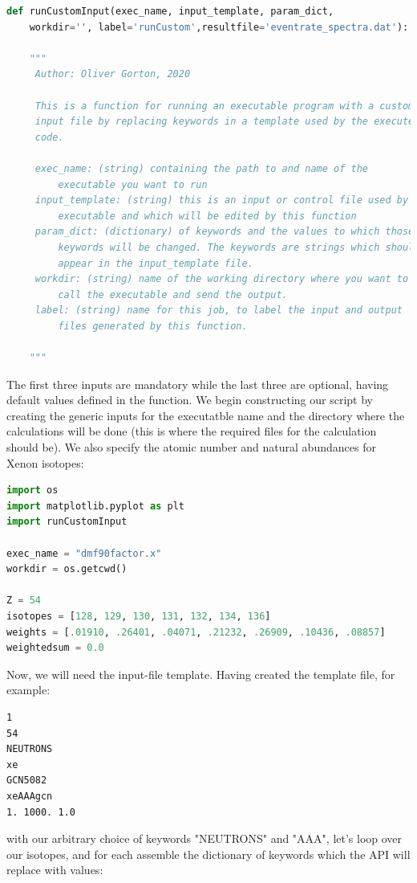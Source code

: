 \documentclass[12pt]{article}
\begin{document}
\begin{lstlisting}[language=python]
def runCustomInput(exec_name, input_template, param_dict,
    workdir='', label='runCustom',resultfile='eventrate_spectra.dat'):

    """
     Author: Oliver Gorton, 2020

     This is a function for running an executable program with a custom
     input file by replacing keywords in a template used by the executed
     code.

     exec_name: (string) containing the path to and name of the
         executable you want to run
     input_template: (string) this is an input or control file used by the 
         executable and which will be edited by this function
     param_dict: (dictionary) of keywords and the values to which those 
         keywords will be changed. The keywords are strings which should 
         appear in the input_template file. 
     workdir: (string) name of the working directory where you want to 
         call the executable and send the output.
     label: (string) name for this job, to label the input and output 
         files generated by this function.

    """
\end{lstlisting}
The first three inputs are mandatory while the last three are optional, having
default values defined in the function.
We begin constructing our script by creating the generic inputs for the
executatble name and the directory where the calculations will be done (this is
where the required files for the calculation should be). We also specify the 
atomic number and natural abundances for Xenon isotopes:
\begin{lstlisting}[language=python]
import os
import matplotlib.pyplot as plt
import runCustomInput

exec_name = "dmf90factor.x"
workdir = os.getcwd()

Z = 54
isotopes = [128, 129, 130, 131, 132, 134, 136]
weights = [.01910, .26401, .04071, .21232, .26909, .10436, .08857]
weightedsum = 0.0
\end{lstlisting}
Now, we will need the input-file template. Having created the template file, for
example:
\begin{verbatim}
1
54
NEUTRONS
xe
GCN5082
xeAAAgcn
1. 1000. 1.0
\end{verbatim}
with our arbitrary choice of keywords "NEUTRONS" and "AAA", 
let's loop over our isotopes, and for each assemble the dictionary of
keywords which the API will replace with values:
\end{document}
